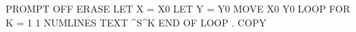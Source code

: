 PROMPT OFF                                                                      
ERASE                                                                           
LET X = X0                                                                      
LET Y = Y0                                                                      
MOVE X0 Y0                                                                      
LOOP FOR K = 1 1 NUMLINES                                                       
TEXT ^S^K                                                                       
END OF LOOP                                                                     
. COPY                                                                          
